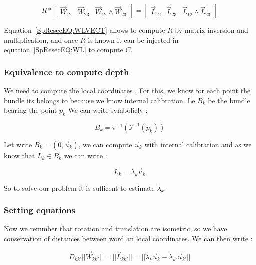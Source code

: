 \begin{equation}
	R* \begin{bmatrix} \Vec{W}_{12} & \Vec{W}_{23} &  \Vec{W}_{12} \wedge \Vec{W}_{23} \end{bmatrix} 
        =  \begin{bmatrix} \Vec{L}_{12} & \Vec{L}_{23} &  \Vec{L}_{12} \wedge \Vec{L}_{23} \end{bmatrix} 
        \label{SpResecEQ:WLVECT}
\end{equation}

Equation~\ref{SpResecEQ:WLVECT} allows to compute $R$ by matrix inversion and multiplication, and 
once $R$ is known it can be injected in equation~\ref{SpResecEQ:WL} to compute $C$.

\subsubsection{Equivalence to compute depth}

We need to compute the local coordinates . For this, we know for each point the bundle its belongs
to because we know internal calibration. Le $B_k$ be the bundle bearing the point $p_k$ We can write symbolicly :


\begin{equation}
	B_k =  \pi^{-1} (\mathcal I ^{-1} (p_k)) \label{SpResecEQ:DefBundle}
\end{equation}



Let write $B_k = (0,\Vec{u}_k)$,  we can compute $\Vec{u}_k$ with internal calibration and
as we know that $L_k \in B_k$ we can write  :


\begin{equation}
	L_k = \lambda_k \Vec{u}_k \label{SpResecEQ:DefLambda}
\end{equation}

So to solve our problem it is sufficent to estimate $\lambda_k$.

\subsubsection{Setting equations}

Now we remmber that rotation and translation are isometric, so we have conservation of
distances between  word an local coordinates. We can then write :

\begin{equation}
     D_{kk'}	||\Vec{W}_{kk'}||   = || \Vec{L}_{kk'} || = || \lambda_k \Vec{u}_k -  \lambda_{k'} \Vec{u}_{k'}|| \label{SpResecEQ:ConsDist}
\end{equation}


